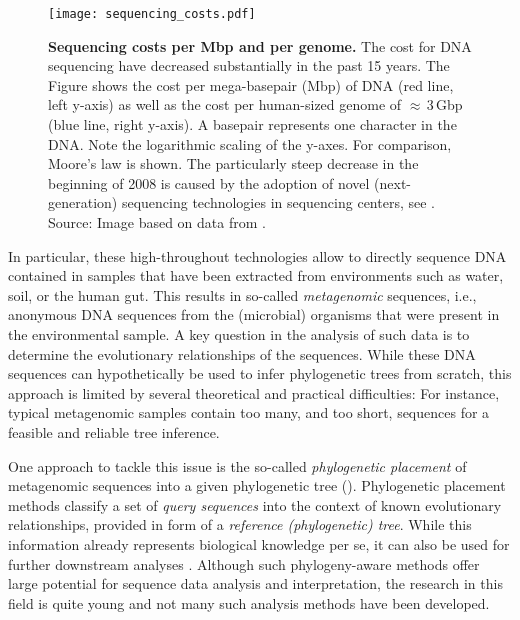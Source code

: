 \begin{figure}[hbt]
    \centering
    \texttt{[image: sequencing\_costs.pdf]}
    \caption[Sequencing costs per Mbp and per genome]{
        \textbf{Sequencing costs per Mbp and per genome.}
        The cost for DNA sequencing have decreased substantially in the past 15 years.
        The Figure shows the cost per mega-basepair (Mbp) of DNA (red line, left y-axis)
        as well as the cost per human-sized genome of $\approx$\,\num{3}\,Gbp (blue line, right y-axis).
        A basepair represents one character in the DNA.
        Note the logarithmic scaling of the y-axes.
        For comparison, Moore's law \cite{Moore1965} is shown.
        The particularly steep decrease in the beginning of 2008 is caused by
        the adoption of novel (next-generation) sequencing technologies in sequencing centers,
        see .
        Source: Image based on data from \cite{Wetterstrand2018}.
    }
    \label{fig:sequencing_costs}
\end{figure}

In particular, these high-throughout technologies allow to directly sequence DNA contained in samples
that have been extracted from environments such as water, soil, or the human gut.
This results in so-called \emph{metagenomic} sequences,
i.e., anonymous DNA sequences from the (microbial) organisms that were present in the environmental sample.
A key question in the analysis of such data is to determine the evolutionary relationships of the sequences.
While these DNA sequences can hypothetically be used to infer phylogenetic trees from scratch,
this approach is limited by several theoretical and practical difficulties:
For instance, typical metagenomic samples contain too many, and too short, sequences
for a feasible and reliable tree inference.

One approach to tackle this issue is the so-called \emph{phylogenetic placement} \cite{Matsen2010,Berger2011}
of metagenomic sequences into a given phylogenetic tree ().
Phylogenetic placement methods classify a set of \emph{query sequences}
into the context of known evolutionary relationships, provided in form of a \emph{reference (phylogenetic) tree}.
While this information already represents biological knowledge per se,
it can also be used for further downstream analyses \cite{Matsen2011a}.
Although such phylogeny-aware methods offer large potential for sequence data analysis and interpretation,
the research in this field is quite young and not many such analysis methods have been developed.

